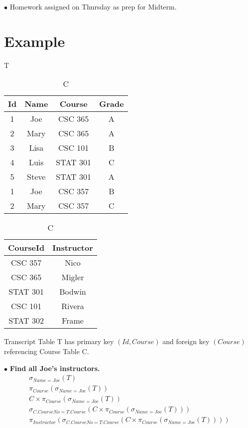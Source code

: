 \documentclass[twoside]{article}
\begin{document}
$\bullet$ Homework assigned on Thursday as prep for Midterm.

\section*{Example}

\begin{table}[!htb]
    \begin{minipage}{.5\linewidth}
      \caption{T}
      \centering
        \begin{tabular}{c|c|c|c}
            Id & Name & Course & Grade \\
            \hline
            1 & Joe & CSC 365 & A \\
            2 & Mary & CSC 365 & A \\
            3 & Lisa & CSC 101 & B \\
            4 & Luis & STAT 301 & C \\
            5 & Steve & STAT 301 & A \\
            1 & Joe & CSC 357 & B \\
            2 & Mary & CSC 357 & C \\
        \end{tabular}
    \end{minipage}
    \begin{minipage}{.25\linewidth}
      \centering
        \caption{C}
        \begin{tabular}{c|c}
            CourseId & Instructor \\
            \hline
            CSC 357 & Nico \\
            CSC 365 & Migler \\
            STAT 301 & Bodwin \\
            CSC 101 & Rivera \\
            STAT 302 & Frame \\
        \end{tabular}
    \end{minipage} 
\end{table}

Transcript Table T has primary key $(Id, Course)$ and foreign key $(Course)$ 
referencing Course Table C.

$\bullet$ \textbf{Find all Joe's instructors.}
\begin{gather*}
    \sigma_{Name=Joe}(T) \\
    \pi_{Course}(\sigma_{Name=Joe}(T)) \\
    C \times \pi_{Course}(\sigma_{Name=Joe}(T)) \\
    \sigma_{C.CourseNo=T.Course}(C \times \pi_{Course}(\sigma_{Name=Joe}(T))) \\
    \pi_{Instructor}(\sigma_{C.CourseNo=T.Course}(C 
    \times \pi_{Course}(\sigma_{Name=Joe}(T)))) \\
\end{gather*}
\end{document}
